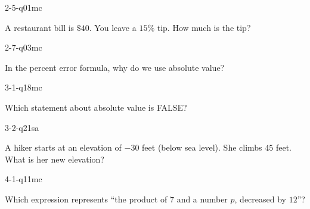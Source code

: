 \begin{practiceQuestion}{2-5-q01}{mc}
\begin{questionText}
A restaurant bill is $\$40$. You leave a $15\%$ tip. How much is the tip?
\end{questionText}
\end{practiceQuestion}

\begin{practiceQuestion}{2-7-q03}{mc}
\begin{questionText}
In the percent error formula, why do we use absolute value?
\end{questionText}
\end{practiceQuestion}

\begin{practiceQuestion}{3-1-q18}{mc}
\begin{questionText}
Which statement about absolute value is FALSE?
\end{questionText}
\end{practiceQuestion}

\begin{practiceQuestion}{3-2-q21}{sa}
\begin{questionText}
A hiker starts at an elevation of $-30$ feet (below sea level). She climbs $45$ feet. What is her new elevation?
\end{questionText}
\end{practiceQuestion}

\begin{practiceQuestion}{4-1-q11}{mc}
\begin{questionText}
Which expression represents ``the product of $7$ and a number $p$, decreased by $12$''?
\end{questionText}
\end{practiceQuestion}

